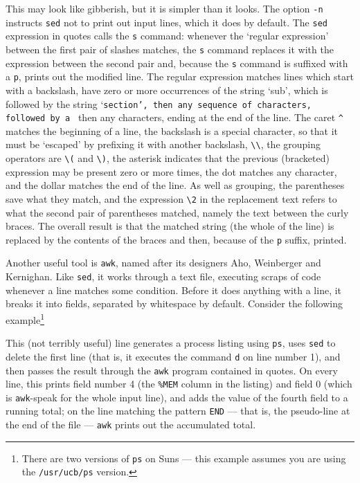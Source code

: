 \documentclass[11pt,oneside,chapters]{starlink}
\begin{document}
This may look like
gibberish, but it is simpler than it looks.  The option
\texttt{-n} instructs \texttt{sed} not to print
out input lines, which it does by default.  The
\texttt{sed} expression in quotes calls the
\texttt{s} command: whenever the `regular
expression' between the first pair of slashes matches,
the \texttt{s} command replaces it with the
expression between the second pair and, because the
\texttt{s} command is suffixed with a
\texttt{p}, prints out the modified line.  The
regular expression matches lines which start with a
backslash, have zero or more occurrences of the string
`sub', which is followed by the string
`\texttt{section{}', then any sequence of
characters, followed by a \texttt{}} then any
characters, ending at the end of the line.  The caret
\texttt{\^} matches the beginning of a line, the
backslash is a special character, so that it must be
`escaped' by prefixing it with another backslash,
\texttt{\textbackslash\textbackslash}, the grouping operators are
\texttt{\textbackslash{}(} and \texttt{\textbackslash{})}, the asterisk
indicates that the previous (bracketed) expression may
be present zero or more times, the dot matches any
character, and the dollar matches the end of the line.
As well as grouping, the parentheses save what they
match, and the expression \texttt{\textbackslash{}2} in the
replacement text refers to what the second pair of
parentheses matched, namely the text between the curly
braces.  The overall result is that the matched string
(the whole of the line) is replaced by the contents of
the braces and then, because of the \texttt{p}
suffix, printed.

Another useful tool is \texttt{awk}, named after
its designers Aho, Weinberger and Kernighan.  Like
\texttt{sed}, it works through a text file,
executing scraps of code whenever a line matches some
condition.  Before it does anything with a line, it
breaks it into fields, separated by whitespace by
default.  Consider the following example\footnote{There
are two versions of \texttt{ps} on Suns --- this
example assumes you are using the
\texttt{/usr/ucb/ps} version.}


This (not terribly useful) line generates a process
listing using \texttt{ps}, uses \texttt{sed} to
delete the first line (that is, it executes the command
\texttt{d} on line number 1), and then passes the
result through the \texttt{awk} program contained in
quotes.  On every line, this prints field number 4 (the
\texttt{\%MEM} column in the listing) and field 0
(which is \texttt{awk}-speak for the whole input
line), and adds the value of the fourth field to a
running total; on the line matching the pattern
\texttt{END} --- that is, the pseudo-line at the end
of the file --- \texttt{awk} prints out the
accumulated total.
\end{document}
